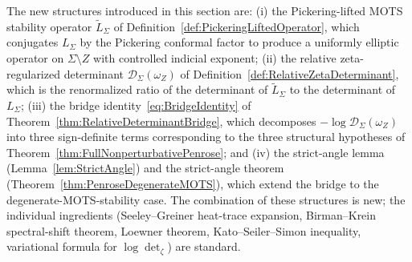 \begin{remark}\label{rem:BridgeNovelty}
The new structures introduced in this section are: (i) the Pickering-lifted MOTS stability operator $\tilde L_\Sigma$ of Definition~\ref{def:PickeringLiftedOperator}, which conjugates $L_\Sigma$ by the Pickering conformal factor to produce a uniformly elliptic operator on $\Sigma\setminus Z$ with controlled indicial exponent; (ii) the relative zeta-regularized determinant $\mathscr D_\Sigma(\omega_Z)$ of Definition~\ref{def:RelativeZetaDeterminant}, which is the renormalized ratio of the determinant of $\tilde L_\Sigma$ to the determinant of $L_\Sigma$; (iii) the bridge identity~\eqref{eq:BridgeIdentity} of Theorem~\ref{thm:RelativeDeterminantBridge}, which decomposes $-\log\mathscr D_\Sigma(\omega_Z)$ into three sign-definite terms corresponding to the three structural hypotheses of Theorem~\ref{thm:FullNonperturbativePenrose}; and (iv) the strict-angle lemma (Lemma~\ref{lem:StrictAngle}) and the strict-angle theorem (Theorem~\ref{thm:PenroseDegenerateMOTS}), which extend the bridge to the degenerate-MOTS-stability case. The combination of these structures is new; the individual ingredients (Seeley--Greiner heat-trace expansion, Birman--Krein spectral-shift theorem, Loewner theorem, Kato--Seiler--Simon inequality, variational formula for $\log\det_\zeta$) are standard.
\end{remark}
